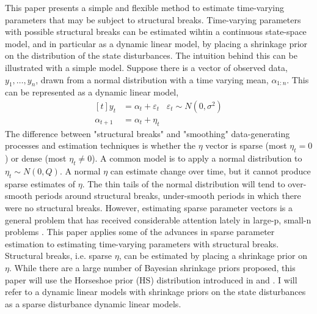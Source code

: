 \documentclass{article}
\begin{document}
This paper presents a simple and flexible method to estimate time-varying parameters that may be subject to structural breaks.
Time-varying parameters with possible structural breaks can be estimated wihtin a continuous state-space model, and in particular as a dynamic linear model, by placing a shrinkage prior on the distribution of the state disturbances.
The intuition behind this can be illustrated with a simple model.
Suppose there is a vector of observed data, $y_{1}, \dots, y_{n}$, drawn from a normal distribution with a time varying mean, $\alpha_{1:n}$. 
This can be represented as a dynamic linear model,
\begin{equation}
  \label{eq:4}
  \begin{aligned}[t]
    y_{t} &= \alpha_{t} + \varepsilon_{t} & \varepsilon_{t} \sim N(0, \sigma^{2}) \\
    \alpha_{t + 1} &= \alpha_{t} + \eta_{t}
  \end{aligned}
\end{equation}
The difference between "structural breaks" and "smoothing" data-generating processes and estimation techniques is whether the $\eta$ vector is sparse (most $\eta_{t} = 0$) or dense (most $\eta_{t} \neq 0$).
A common model is to apply a normal distribution to $\eta_{t} \sim N(0, Q)$.
A normal $\eta$ can estimate change over time, but it cannot produce sparse estimates of $\eta$.
The thin tails of the normal distribution will tend to over-smooth periods around structural breaks, under-smooth periods in which there were no structural breaks.
However, estimating sparse parameter vectors is a general problem that has received considerable attention lately in large-p, small-n problems \parencites{Tibshirani1996}{PolsonScott2010}.
This paper applies some of the advances in sparse parameter estimation to estimating time-varying parameters with structural breaks.
Structural breaks, i.e. sparse $\eta$, can be estimated by placing a shrinkage prior on $\eta$.
While there are a large number of Bayesian shrinkage priors proposed, this paper will use the Horseshoe prior (HS) distribution introduced in \textcites{CarvalhoPolsonScott2009} and \textcite{CarvalhoPolsonScott2010}.
I will refer to a dynamic linear models with shrinkage priors on the state disturbances as a sparse disturbance dynamic linear models.
\end{document}
